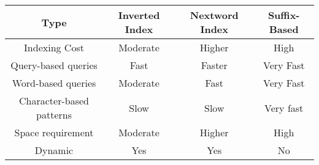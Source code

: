 \begin{center}
 \begin{tabular}{c c c c} 
 \toprule
 Type
 	& Inverted Index
		& Nextword Index
			& Suffix-Based
\\ 
 \midrule
 Indexing Cost
 	& Moderate
		& Higher
			& High \\ 

 Query-based queries
 	& Fast & Faster & Very Fast \\
	
 Word-based queries
 	& Moderate & Fast & Very Fast \\	
 
 Character-based patterns
 	& Slow
		& Slow
			& Very fast
\\

 Space requirement
 	& Moderate
		& Higher
			& High
 \\

 Dynamic & Yes & Yes & No \\ [1ex] 
 \bottomrule
\end{tabular}
\end{center}